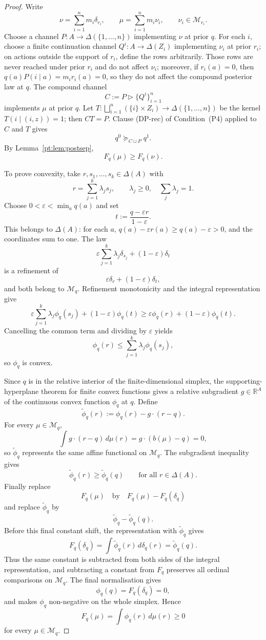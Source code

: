 \documentclass[11pt,a4paper]{article}
\theoremstyle{definition}
\newcommand{\R}{\mathbb R}
\newcommand{\1}{\mathbf 1}
\begin{document}
\begin{proof}
Write
\[
\nu=\sum_{i=1}^n m_i\delta_{r_i},
\qquad
\mu=\sum_{i=1}^n m_i\nu_i,
\qquad
\nu_i\in\mathcal M_{r_i}.
\]
Choose a channel $P:A\to\Delta(\{1,\dots,n\})$ implementing $\nu$ at prior $q$.  For each $i$, choose a finite
continuation channel $Q^i:A\to\Delta(Z_i)$ implementing $\nu_i$ at prior $r_i$; on actions outside the support of
$r_i$, define the rows arbitrarily.  Those rows are never reached under prior $r_i$ and do not affect $\nu_i$; moreover,
if $r_i(a)=0$, then $q(a)P(i\mid a)=m_i r_i(a)=0$, so they do not affect the compound posterior law at $q$.  The compound
channel
\[
C:=P\triangleright\{Q^i\}_{i=1}^n
\]
implements $\mu$ at prior $q$.  Let $T:\bigsqcup_{i=1}^n(\{i\}\times Z_i)\to\Delta(\{1,\dots,n\})$ be the kernel
$T(i\mid(i,z))=1$; then $CT=P$.  Clause \textup{(DP-rec)} of Condition~\textup{(P4)} applied to $C$ and $T$ gives
\[
q^0\succeq_{C\sqcup P}q^1.
\]
By Lemma~\ref{pt:lem:postsep},
\[
F_q(\mu)\ge F_q(\nu).
\]

To prove convexity, take $r,s_1,\dots,s_k\in\Delta(A)$ with
\[
r=\sum_{j=1}^k\lambda_j s_j,
\qquad
\lambda_j\ge 0,\quad \sum_j\lambda_j=1.
\]
Choose $0<\varepsilon<\min_a q(a)$ and set
\[
t:=\frac{q-\varepsilon r}{1-\varepsilon}.
\]
This belongs to $\Delta(A)$: for each $a$, $q(a)-\varepsilon r(a)\ge q(a)-\varepsilon>0$, and the coordinates sum to one.
The law
\[
\varepsilon\sum_{j=1}^k\lambda_j\delta_{s_j}+(1-\varepsilon)\delta_t
\]
is a refinement of
\[
\varepsilon\delta_r+(1-\varepsilon)\delta_t,
\]
and both belong to $\mathcal M_q$.  Refinement monotonicity and the integral representation give
\[
\varepsilon\sum_{j=1}^k\lambda_j\phi_q(s_j)+(1-\varepsilon)\phi_q(t)
\ge
\varepsilon\phi_q(r)+(1-\varepsilon)\phi_q(t).
\]
Cancelling the common term and dividing by $\varepsilon$ yields
\[
\phi_q(r)\le \sum_{j=1}^k\lambda_j\phi_q(s_j),
\]
so $\phi_q$ is convex.

Since $q$ is in the relative interior of the finite-dimensional simplex, the supporting-hyperplane theorem for finite
convex functions gives a relative subgradient $g\in\R^A$ of the continuous convex function $\phi_q$ at $q$.  Define
\[
\widetilde\phi_q(r):=\phi_q(r)-g\cdot(r-q).
\]
For every $\mu\in\mathcal M_q$,
\[
\int g\cdot(r-q)\,d\mu(r)=g\cdot(b(\mu)-q)=0,
\]
so $\widetilde\phi_q$ represents the same affine functional on $\mathcal M_q$.  The subgradient inequality gives
\[
\widetilde\phi_q(r)\ge \widetilde\phi_q(q)
\qquad\text{for all }r\in\Delta(A).
\]
Finally replace
\[
F_q(\mu)\quad\text{by}\quad F_q(\mu)-F_q(\delta_q)
\]
and replace $\widetilde\phi_q$ by
\[
\widetilde\phi_q-\widetilde\phi_q(q).
\]
Before this final constant shift, the representation with $\widetilde\phi_q$ gives
\[
F_q(\delta_q)=\int \widetilde\phi_q(r)\,d\delta_q(r)=\widetilde\phi_q(q).
\]
Thus the same constant is subtracted from both sides of the integral representation, and subtracting a constant from
$F_q$ preserves all ordinal comparisons on $\mathcal M_q$.  The final normalisation gives
\[
\phi_q(q)=F_q(\delta_q)=0,
\]
and makes $\phi_q$ non-negative on the whole simplex.  Hence
\[
F_q(\mu)=\int\phi_q(r)\,d\mu(r)\ge 0
\]
for every $\mu\in\mathcal M_q$.
\end{proof}
\end{document}
